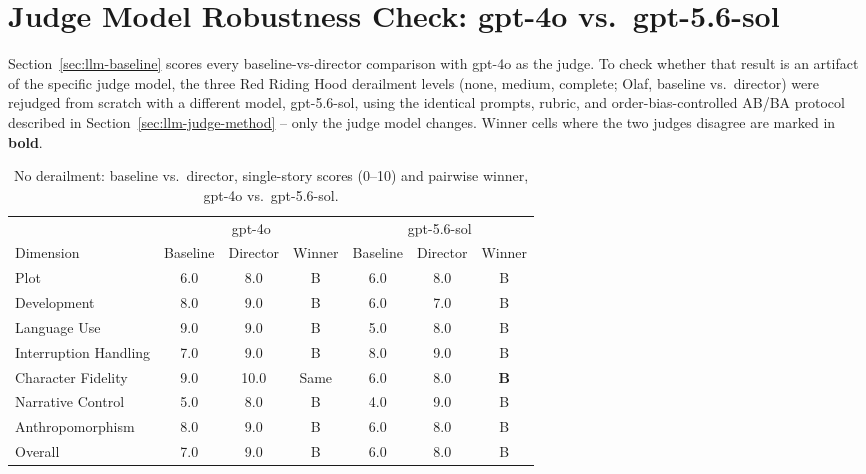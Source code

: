 \documentclass[10pt]{article}
\begin{document}
\section{Judge Model Robustness Check: gpt-4o vs.\ gpt-5.6-sol}
\label{sec:judge-model-comparison}

Section~\ref{sec:llm-baseline} scores every baseline-vs-director comparison
with gpt-4o as the judge. To check whether that result is an artifact of
the specific judge model, the three Red Riding Hood derailment levels
(none, medium, complete; Olaf, baseline vs.\ director) were rejudged from
scratch with a different model, gpt-5.6-sol, using the identical prompts,
rubric, and order-bias-controlled AB/BA protocol described in
Section~\ref{sec:llm-judge-method} -- only the judge model changes. Winner
cells where the two judges disagree are marked in \textbf{bold}.

\begin{table}[htbp]
\centering
\caption{No derailment: baseline vs.\ director, single-story scores (0--10) and pairwise winner, gpt-4o vs.\ gpt-5.6-sol.}
\label{tab:judge-cmp-none}
\small
\begin{tabular}{lcccccc}
\toprule
 & \multicolumn{3}{c}{gpt-4o} & \multicolumn{3}{c}{gpt-5.6-sol} \\
\cmidrule(lr){2-4} \cmidrule(lr){5-7}
Dimension & Baseline & Director & Winner & Baseline & Director & Winner \\
\midrule
Plot                   & 6.0 & 8.0  & B    & 6.0 & 8.0 & B \\
Development             & 8.0 & 9.0  & B    & 6.0 & 7.0 & B \\
Language Use            & 9.0 & 9.0  & B    & 5.0 & 8.0 & B \\
Interruption Handling   & 7.0 & 9.0  & B    & 8.0 & 9.0 & B \\
Character Fidelity      & 9.0 & 10.0 & Same & 6.0 & 8.0 & \textbf{B} \\
Narrative Control       & 5.0 & 8.0  & B    & 4.0 & 9.0 & B \\
Anthropomorphism        & 8.0 & 9.0  & B    & 6.0 & 8.0 & B \\
Overall                  & 7.0 & 9.0  & B    & 6.0 & 8.0 & B \\
\bottomrule
\end{tabular}
\end{table}
\end{document}
